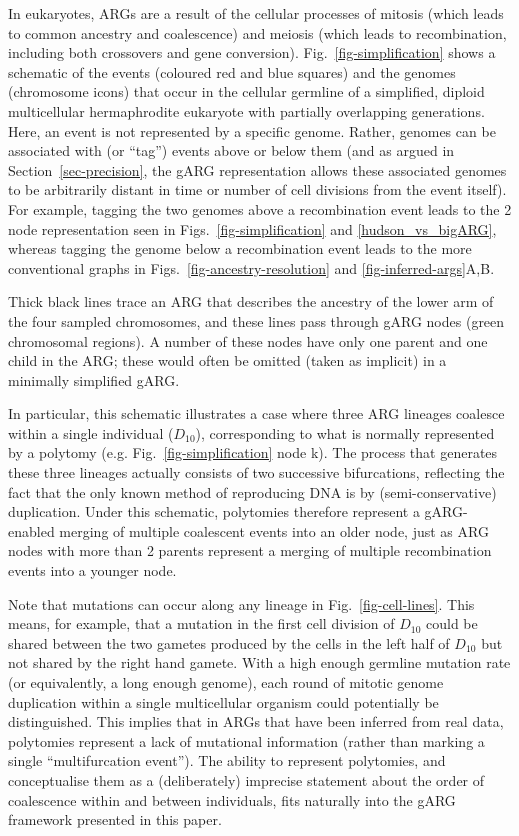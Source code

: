 \documentclass{article}
\newcommand{\noderef}[1]{\textsf{#1}}
\begin{document}
In eukaryotes, ARGs are a result of the cellular processes of mitosis
(which leads to common ancestry and coalescence)
and meiosis (which leads to recombination, including both crossovers and gene conversion).
Fig.~\ref{fig-simplification} shows a schematic of the events (coloured red and blue squares) and
the genomes (chromosome icons) that occur in the cellular germline of a simplified, diploid multicellular
hermaphrodite eukaryote with partially overlapping generations.
Here, an event is not represented by a specific
genome. Rather, genomes can be associated with (or ``tag'') events above or below them (and as argued in
Section~\ref{sec-precision}, the gARG representation allows these associated genomes to be arbitrarily distant
in time or number of cell
divisions from the event itself). For example, tagging the two genomes above a recombination event leads to the
2 node representation seen in Figs.~\ref{fig-simplification} and \ref{hudson_vs_bigARG}, whereas tagging the genome
below a recombination event leads to the more conventional graphs in Figs.~\ref{fig-ancestry-resolution} and \ref{fig-inferred-args}A,B.

Thick black lines trace an ARG that describes the ancestry of the lower arm of the
four sampled chromosomes, and these lines pass through gARG nodes (green chromosomal regions).
A number of these nodes have only one parent and one child in the ARG; these would often be omitted
(taken as implicit) in a minimally simplified gARG.

In particular, this schematic illustrates a case where three ARG lineages coalesce within
a single individual ($D_{10}$), corresponding to what is normally represented by a polytomy
(e.g. Fig.~\ref{fig-simplification} node \noderef{k}). The process that generates
these three lineages actually consists of two successive bifurcations, reflecting the fact that
the only known method of reproducing DNA is by (semi-conservative) duplication. Under this schematic,
polytomies therefore represent a gARG-enabled merging of multiple coalescent events into an older
node, just as ARG nodes with more than 2 parents represent a merging of multiple recombination
events into a younger node.

Note that mutations can occur along any lineage in Fig.~\ref{fig-cell-lines}. This means, for example,
that a mutation in the first cell division of $D_{10}$ could be shared between
the two gametes produced by the cells in the left half of $D_{10}$ but not shared by
the right hand gamete. With a high enough germline mutation rate (or equivalently, a long enough genome), each
round of mitotic genome duplication within a single multicellular organism could
potentially be distinguished.
This implies that in ARGs that have been inferred from real data, polytomies represent a lack
of mutational information (rather than marking a single ``multifurcation event'').
The ability to represent polytomies, and conceptualise them as a (deliberately) imprecise statement about the order
of coalescence within and between individuals,
fits naturally into the gARG framework presented in this paper.
\end{document}
